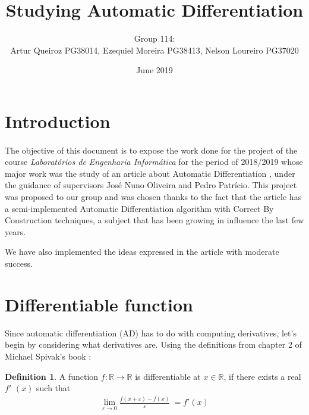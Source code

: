 \documentclass[11pt,a4]{article}
\title{Studying Automatic Differentiation}
\author{Group 114:\\
	Artur Queiroz PG38014, Ezequiel Moreira PG38413, Nelson Loureiro PG37020}
\date{June 2019}
\def\R{\mathbb{R}}
\theoremstyle{definition}
\newtheorem{defi}{Definition}[section]
\theoremstyle{Definition}
\theoremstyle{Definition}
\begin{document}
	
	\maketitle
	
	\section{Introduction}
	\paragraph{} The objective of this document is to expose the work done for the project of the course \emph{Laboratórios de Engenharia Informática} for the period of 2018/2019 whose major work was the study of an article about
	Automatic Differentiation \cite{Elliott:2018}, under the guidance of supervisors José Nuno Oliveira and Pedro Patrício. This project was proposed to our group and was chosen thanks to the fact that the article has a semi-implemented Automatic Differentiation algorithm with Correct By Construction techniques, a subject that has been growing in influence the last few years. 
	\par We have also implemented the ideas expressed in the article with moderate success.
	
	
	
\section{Differentiable function}
	
	Since automatic differentiation (AD) has to do with computing derivatives, let’s begin by considering
	what derivatives are. Using the definitions from chapter 2 of Michael Spivak's book \cite{book}:
	
	\begin{defi}
		A function $f:\R \to \R$ is differentiable at $x \in \R$, if there exists a real \newline $f $$'$ $(x)$ such that
		\begin{align*}
		\lim_{\varepsilon \to 0} \frac{\textit{$f(x+\varepsilon)-f(x)$}}{\varepsilon} \ = \textit{$f'(x)$}  
		\end{align*}
	\end{defi}
	
\end{document}
